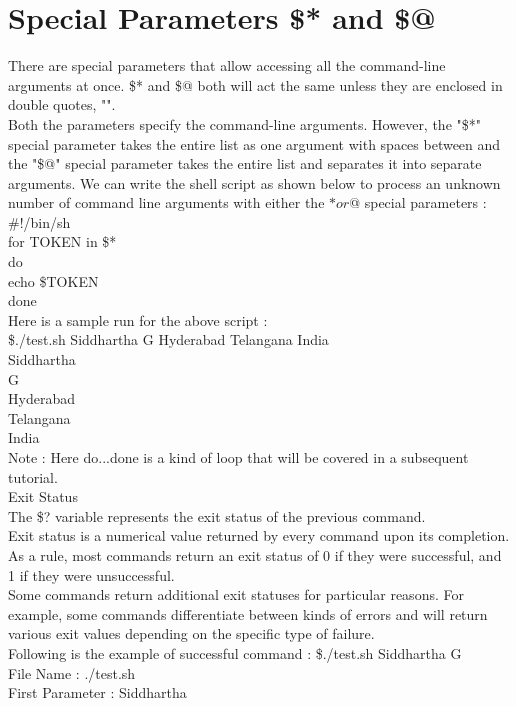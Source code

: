 \documentclass{article}
\begin{document}
\section*{Special Parameters \$* and \$@}
There are special parameters that allow accessing all the command-line arguments at once. \$* and \$@ both will act the same unless they are enclosed in double quotes, "".\\
Both the parameters specify the command-line arguments. However, the "\$*" special parameter takes the entire list as one argument with spaces between and the "\$@" special parameter takes the entire list and separates it into separate arguments.
We can write the shell script as shown below to process an unknown number of command line arguments with either the $* or $@ special parameters :\\
\#!/bin/sh\\
for TOKEN in \$*\\
do\\
   echo \$TOKEN\\
done\\
Here is a sample run for the above script :\\
\$./test.sh Siddhartha G Hyderabad Telangana India\\
Siddhartha\\
G\\
Hyderabad\\
Telangana\\
India\\
Note : Here do...done is a kind of loop that will be covered in a subsequent tutorial.\\
Exit Status\\
The \$? variable represents the exit status of the previous command.\\
Exit status is a numerical value returned by every command upon its completion. As a rule, most commands return an exit status of 0 if they were successful, and 1 if they were unsuccessful.\\
Some commands return additional exit statuses for particular reasons. For example, some commands differentiate between kinds of errors and will return various exit values depending on the specific type of failure.\\
Following is the example of successful command :
\$./test.sh Siddhartha G\\
File Name : ./test.sh\\
First Parameter : Siddhartha\\
\end{document}

